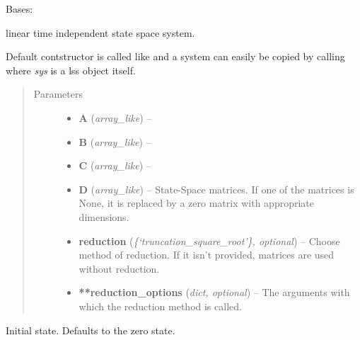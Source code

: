 \documentclass[letterpaper,10pt,english]{sphinxmanual}
\begin{document}
\begin{fulllineitems}
\label{pod:pod.isStable}
\end{fulllineitems}


\begin{fulllineitems}
\label{pod:pod.lss}
Bases: 

linear time independent state space system.

Default contstructor is called like  and a system can
easily be copied by calling  where \emph{sys} is a
lss object itself.
\begin{quote}\begin{description}
\item[{Parameters}] \leavevmode\begin{itemize}
\item {} 
\textbf{A} (\emph{array\_like}) -- 

\item {} 
\textbf{B} (\emph{array\_like}) -- 

\item {} 
\textbf{C} (\emph{array\_like}) -- 

\item {} 
\textbf{D} (\emph{array\_like}) -- State-Space matrices. If one of the matrices is None, it is
replaced by a zero matrix with appropriate dimensions.

\item {} 
\textbf{reduction} (\emph{\{`truncation\_square\_root'\}, optional}) -- Choose method of reduction. If it isn't provided, matrices are
used without reduction.

\item {} 
\textbf{**reduction\_options} (\emph{dict, optional}) -- The arguments with which the reduction method is called.

\end{itemize}

\end{description}\end{quote}

\begin{fulllineitems}
\label{pod:pod.lss.x0}
Initial state. Defaults to the zero state.


\end{fulllineitems}
\end{fulllineitems}
\end{document}
